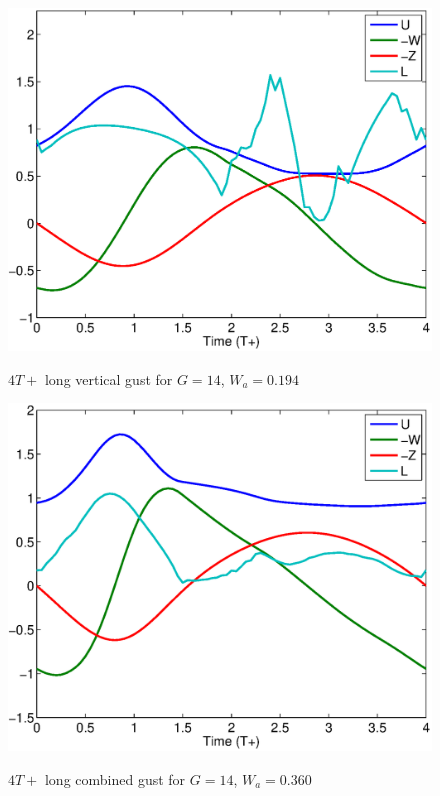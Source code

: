 \begin{figure}[ht]
  \begin{center}
    \scalebox{0.8}
    {\includegraphics{./Figures/Windtype=1_Tg=4_Wg=0p194_quad_G=13.eps}}
  \end{center}
  \caption{$4T+$ long vertical gust for $G=14$, $W_a=0.194$}
  \label{fig:vertical_optimization_UAV_modified}
\end{figure}


\begin{figure}[ht]
  \begin{center}
    \scalebox{0.8}
    {\includegraphics{./Figures/Windtype=3_Tg=4_Wg=0p360_quad_G=13.eps}}
  \end{center}
  \caption{$4T+$ long combined gust for $G=14$, $W_a=0.360$}
  \label{fig:combined_optimization_UAV_modified}
\end{figure}

